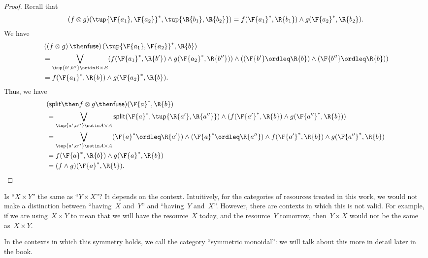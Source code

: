 \begin{proof}
    Recall that
    \begin{equation}
        (f\otimes g)(\tup{\F{a_1},\F{a_2}}^*,\tup{\R{b_1},\R{b_2}})
        =f(\F{a_1}^*,\R{b_1})\wedge g(\F{a_2}^*,\R{b_2}).
    \end{equation}
    We have
    \begin{equation}
        \begin{aligned}
             & \left(\left(f\otimes g\right) \then \mathsf{fuse}\right)(\tup{\F{a_1},\F{a_2}}^*,\R{b}) \\
             & =\bigvee_{\tup{b',b''}\setin B\times B}(f(\F{a_1}^*,\R{b'})\wedge g(\F{a_2}^*,\R{b''}))\wedge ((\F{b'}\ordleq \R{b}) \wedge (\F{b''}\ordleq \R{b})) \\
             & =f(\F{a_1}^*,\R{b})\wedge g(\F{a_2}^*,\R{b}).
        \end{aligned}
    \end{equation}
    Thus, we have
    \begin{equation}
        \begin{aligned}
             & (\mathsf{split}\then f\otimes g\then \mathsf{fuse})(\F{a}^*,\R{b}) \\&=\bigvee_{\tup{a',a''}\setin A\times A} \mathsf{split}(\F{a}^*,\tup{\R{a'},\R{a''}})\wedge (f(\F{a'}^*,\R{b})\wedge g(\F{a''}^*,\R{b}))\\
             & =\bigvee_{\tup{a',a''}\setin A\times A}(\F{a}^*\ordleq \R{a'})\wedge (\F{a}^*\ordleq \R{a''})\wedge f(\F{a'}^*,\R{b})\wedge g(\F{a''}^*,\R{b}) \\
             & =f(\F{a}^*,\R{b})\wedge g(\F{a}^*,\R{b}) \\
             & =(f\wedge g)(\F{a}^*,\R{b}).
        \end{aligned}
    \end{equation}
\end{proof}

Is ``$X \times Y$'' the same as ``$Y \times X$''?
It depends on the context.
Intuitively, for the categories of resources treated in this work, we would not make a distinction between ``having~$X$ and~$Y$'' and ``having~$Y$ and~$X$''.
However, there are contexts in which this is not valid.
For example, if we are using~$X \times Y$ to mean that we will have the resource~$X$ today, and the resource~$Y$ tomorrow, then~$Y \times X$ would not be the same as~$X \times Y$.

In the contexts in which this symmetry holds, we call the category ``symmetric monoidal'': we will talk about this more in detail later in the book.


